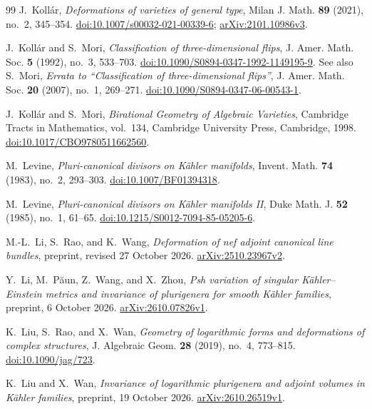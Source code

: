 \documentclass[11pt,a4paper]{article}
\numberwithin{equation}{section}
\theoremstyle{definition}
\theoremstyle{remark}
\begin{document}
\begin{thebibliography}{99}
J.~Kollár,
\emph{Deformations of varieties of general type},
Milan J. Math. \textbf{89} (2021), no.~2, 345--354.
\href{https://doi.org/10.1007/s00032-021-00339-6}{doi:10.1007/s00032-021-00339-6};
\href{https://arxiv.org/abs/2101.10986v3}{arXiv:2101.10986v3}.

J.~Kollár and S.~Mori,
\emph{Classification of three-dimensional flips},
J. Amer. Math. Soc. \textbf{5} (1992), no.~3, 533--703.
\href{https://doi.org/10.1090/S0894-0347-1992-1149195-9}{doi:10.1090/S0894-0347-1992-1149195-9}.
See also S.~Mori, \emph{Errata to “Classification of three-dimensional flips”},
J. Amer. Math. Soc. \textbf{20} (2007), no.~1, 269--271.
\href{https://doi.org/10.1090/S0894-0347-06-00543-1}{doi:10.1090/S0894-0347-06-00543-1}.

J.~Kollár and S.~Mori,
\emph{Birational Geometry of Algebraic Varieties},
Cambridge Tracts in Mathematics, vol.~134,
Cambridge University Press, Cambridge, 1998.
\href{https://doi.org/10.1017/CBO9780511662560}{doi:10.1017/CBO9780511662560}.

M.~Levine,
\emph{Pluri-canonical divisors on Kähler manifolds},
Invent. Math. \textbf{74} (1983), no.~2, 293--303.
\href{https://doi.org/10.1007/BF01394318}{doi:10.1007/BF01394318}.

M.~Levine,
\emph{Pluri-canonical divisors on Kähler manifolds II},
Duke Math. J. \textbf{52} (1985), no.~1, 61--65.
\href{https://doi.org/10.1215/S0012-7094-85-05205-6}{doi:10.1215/S0012-7094-85-05205-6}.

M.-L.~Li, S.~Rao, and K.~Wang,
\emph{Deformation of nef adjoint canonical line bundles},
preprint, revised 27 October 2026.
\href{https://arxiv.org/abs/2510.23967v2}{arXiv:2510.23967v2}.

Y.~Li, M.~Păun, Z.~Wang, and X.~Zhou,
\emph{Psh variation of singular Kähler--Einstein metrics and invariance
of plurigenera for smooth Kähler families},
preprint, 6 October 2026.
\href{https://arxiv.org/abs/2610.07826v1}{arXiv:2610.07826v1}.

K.~Liu, S.~Rao, and X.~Wan,
\emph{Geometry of logarithmic forms and deformations of complex structures},
J. Algebraic Geom. \textbf{28} (2019), no.~4, 773--815.
\href{https://doi.org/10.1090/jag/723}{doi:10.1090/jag/723}.

K.~Liu and X.~Wan,
\emph{Invariance of logarithmic plurigenera and adjoint volumes in
Kähler families},
preprint, 19 October 2026.
\href{https://arxiv.org/abs/2610.26519v1}{arXiv:2610.26519v1}.


\end{thebibliography}
\end{document}

